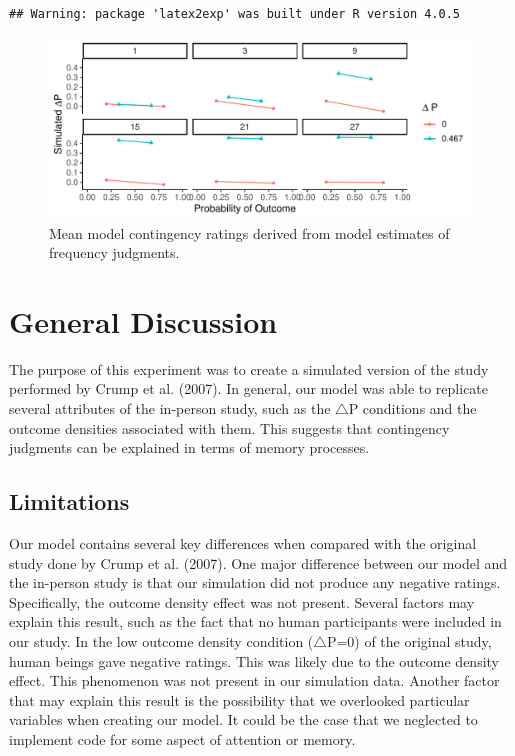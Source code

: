 \documentclass[
  english,
  man,floatsintext]{apa6}
\begin{document}
\begin{verbatim}
## Warning: package 'latex2exp' was built under R version 4.0.5
\end{verbatim}

\begin{figure}

{\centering \includegraphics{Thesis_google_test_files/figure-latex/unnamed-chunk-8-1} 

}

\caption{Mean model contingency ratings derived from model estimates of frequency judgments.}\label{fig:unnamed-chunk-8}
\end{figure}

\hypertarget{general-discussion}{%
\section{General Discussion}\label{general-discussion}}

The purpose of this experiment was to create a simulated version of the study performed by Crump et al. (2007). In general, our model was able to replicate several attributes of the in-person study, such as the \(\triangle\)P conditions and the outcome densities associated with them. This suggests that contingency judgments can be explained in terms of memory processes.

\hypertarget{limitations}{%
\subsection{Limitations}\label{limitations}}

Our model contains several key differences when compared with the original study done by Crump et al. (2007). One major difference between our model and the in-person study is that our simulation did not produce any negative ratings. Specifically, the outcome density effect was not present. Several factors may explain this result, such as the fact that no human participants were included in our study. In the low outcome density condition (\(\triangle\)P=0) of the original study, human beings gave negative ratings. This was likely due to the outcome density effect. This phenomenon was not present in our simulation data. Another factor that may explain this result is the possibility that we overlooked particular variables when creating our model. It could be the case that we neglected to implement code for some aspect of attention or memory.
\end{document}
